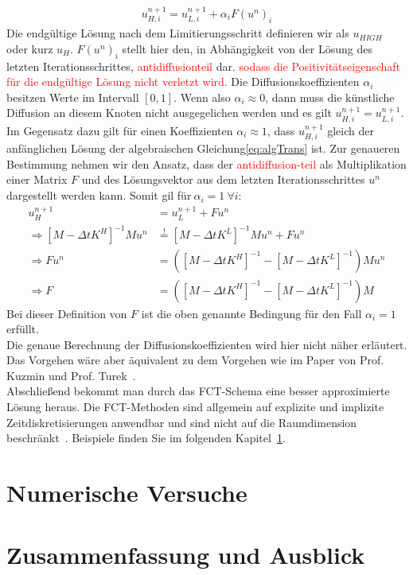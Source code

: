 \documentclass[a4paper,11pt]{article}
\newcommand{\col}[2][red]{\textcolor{#1}{#2}}
\begin{document}
\begin{align}
 u_{H,i}^{n+1}=u_{L,i}^{n+1} +\alpha_iF(u^n)_i\label{eq:Lim}
\end{align}
Die endgültige Lösung nach dem Limitierungsschritt definieren wir als $u_{HIGH}$ oder kurz $u_H$. $F(u^n)_i$ stellt hier den, in Abhängigkeit von der Lösung des letzten Iterationsschrittes, \col{antidiffusionteil} dar. \col{sodass die Positivitätseigenschaft für die endgültige Lösung nicht verletzt wird.} Die Diffusionskoeffizienten $\alpha_i$  besitzen Werte im Intervall $[0,1]$. Wenn also $\alpha_i\approx0$, dann muss die künstliche Diffusion an diesem Knoten nicht ausgegelichen werden und es gilt $u_{H,i}^{n+1}=u_{L,i}^{n+1}$. Im Gegensatz dazu gilt für einen Koeffizienten $\alpha_i\approx1$, dass $u_{H,i}^{n+1}$ gleich der anfänglichen Lösung der algebraischen Gleichung\eqref{eq:algTrans} ist. Zur genaueren Bestimmung nehmen wir den Ansatz, dass der \col{antidiffusion-teil} als Multiplikation einer Matrix $F$ und des Lösungsvektor aus dem letzten Iterationsschrittes $u^n$ dargestellt werden kann. Somit gil für$~\alpha_i=1~\forall i$:
\begin{align}
 u_H^{n+1}&=u_L^{n+1} +Fu^n\\
\Rightarrow [M-\Delta tK^H]^{-1}Mu^n&\overset{!}{=}[M-\Delta tK^L]^{-1}Mu^n+Fu^n\\
\Rightarrow Fu^n&=([M-\Delta tK^H]^{-1}-[M-\Delta tK^L]^{-1})Mu^n\\
\Rightarrow F&=([M-\Delta tK^H]^{-1}-[M-\Delta tK^L]^{-1})M
\end{align}
Bei dieser Definition von $F$ ist die oben genannte Bedingung für den Fall $\alpha_i=1$ erfüllt.\\
Die genaue Berechnung der Diffusionskoeffizienten wird hier nicht näher erläutert. Das Vorgehen wäre aber äquivalent zu dem Vorgehen wie im Paper von Prof. Kuzmin und Prof. Turek~\cite{kuzmin2002flux}.\\
Abschließend bekommt man durch das FCT-Schema eine besser approximierte Lösung heraus. Die FCT-Methoden sind allgemein auf explizite und implizite Zeitdiskretisierungen anwendbar und sind nicht auf die Raumdimension beschränkt~\cite{kuzmin2002flux}. Beispiele finden Sie im folgenden Kapitel~\ref{sec:NumVers}.
\pagebreak
\section{Numerische Versuche}\label{sec:NumVers}
\pagebreak
\section{Zusammenfassung und Ausblick}
\pagebreak
{}
\appendix


\end{document}
